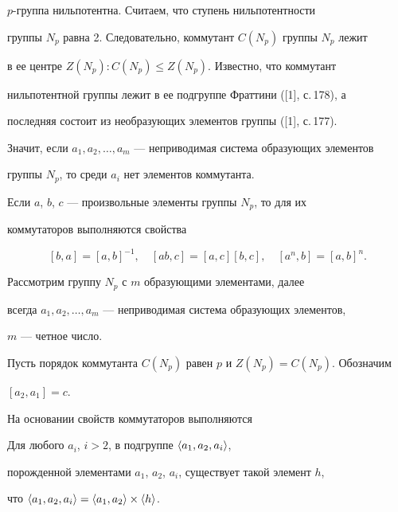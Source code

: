$p$-группа нильпотентна. Считаем, что ступень нильпотентности


группы $N_p$ равна 2. Следовательно, коммутант $C(N_p)$ группы $N_p$ лежит 


в ее центре $Z(N_p):C(N_p)\le Z(N_p)$. Известно, что коммутант


нильпотентной группы лежит в ее подгруппе Фраттини ([1], с.\,178), а


последняя состоит из необразующих элементов группы ([1], с.\,177). 


Значит, если $a_1,a_2,\dotsc,a_m$ --- неприводимая система образующих элементов


группы $N_p$, то среди $a_i$ нет элементов коммутанта.





Если $a$, $b$, $c$ --- произвольные элементы группы $N_p$, то для их 


коммутаторов выполняются свойства


$$


[b,a]=[a,b]^{-1},\quad [ab,c]=[a,c][b,c],\quad [a^n,b]=[a,b]^n.


$$





Рассмотрим группу $N_p$ с $m$ образующими элементами, далее 


всегда $a_1,a_2,\dotsc,a_m$ --- неприводимая система образующих элементов,


$m$ --- четное число.





Пусть порядок коммутанта $C(N_p)$ равен $p$ и $Z(N_p)=C(N_p)$. Обозначим


$[a_2,a_1]=c$.


На основании свойств коммутаторов выполняются








\begin{lemnonum}


Для любого $a_i$, $i>2$, в подгруппе $\langle a_1,a_2,a_i\rangle$, 


порожденной элементами $a_1$, $a_2$, $a_i$, существует такой элемент $h$,


что $\langle a_1,a_2,a_i\rangle=\langle a_1,a_2\rangle\times\langle h\rangle$.


\end{lemnonum}








